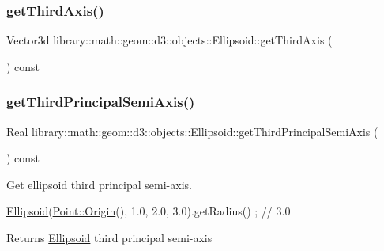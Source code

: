 \subsubsection{\texorpdfstring{get\+Third\+Axis()}{getThirdAxis()}}
{\footnotesize\ttfamily Vector3d library\+::math\+::geom\+::d3\+::objects\+::\+Ellipsoid\+::get\+Third\+Axis (\begin{DoxyParamCaption}{ }\end{DoxyParamCaption}) const}

\mbox{\label{classlibrary_1_1math_1_1geom_1_1d3_1_1objects_1_1_ellipsoid_a62b97423985083db726d34eced6b58ae}} 
\subsubsection{\texorpdfstring{get\+Third\+Principal\+Semi\+Axis()}{getThirdPrincipalSemiAxis()}}
{\footnotesize\ttfamily Real library\+::math\+::geom\+::d3\+::objects\+::\+Ellipsoid\+::get\+Third\+Principal\+Semi\+Axis (\begin{DoxyParamCaption}{ }\end{DoxyParamCaption}) const}



Get ellipsoid third principal semi-\/axis. 


\begin{DoxyCode}
\hyperlink{classlibrary_1_1math_1_1geom_1_1d3_1_1objects_1_1_ellipsoid_aae81fe0edc7f0e8d4590ea89ae73cb14}{Ellipsoid}(\hyperlink{classlibrary_1_1math_1_1geom_1_1d3_1_1objects_1_1_point_ab2a38e285c562e50bf350272c083986f}{Point::Origin}(), 1.0, 2.0, 3.0).getRadius() ; \textcolor{comment}{// 3.0}
\end{DoxyCode}


\begin{DoxyReturn}{Returns}
\hyperlink{classlibrary_1_1math_1_1geom_1_1d3_1_1objects_1_1_ellipsoid}{Ellipsoid} third principal semi-\/axis 
\end{DoxyReturn}
\mbox{\label{classlibrary_1_1math_1_1geom_1_1d3_1_1objects_1_1_ellipsoid_a6d447b106d193af47c6b201f7e01bd26}} 
